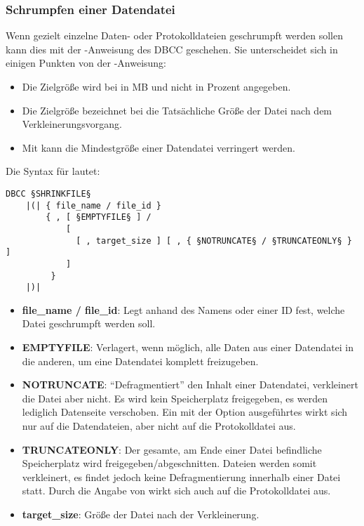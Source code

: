         \subsubsection{Schrumpfen einer Datendatei}
          Wenn gezielt einzelne Daten- oder Protokolldateien geschrumpft werden
          sollen kann dies mit der -Anweisung des DBCC
          geschehen. Sie unterscheidet sich in einigen Punkten von der
          -Anweisung:
          \begin{itemize}
              \item Die Zielgröße wird bei  in MB und
              nicht in Prozent angegeben.
              \item Die Zielgröße bezeichnet bei  die
              Tatsächliche Größe der Datei nach dem Verkleinerungsvorgang.
              \item Mit  kann die Mindestgröße einer
              Datendatei verringert werden.
          \end{itemize}
          Die Syntax für  lautet:
          \begin{lstlisting}[language=ebnf, caption={Die Syntax zu
          SHRINKFILE}, label=admin03_34]
DBCC §SHRINKFILE§
    |(| { file_name / file_id }
        { , [ §EMPTYFILE§ ] / 
            [ 
              [ , target_size ] [ , { §NOTRUNCATE§ / §TRUNCATEONLY§ } ]
            ]
         }
    |)|
          \end{lstlisting}
          \begin{itemize}
            \item \textbf{file\_name / file\_id}: Legt anhand des
            Namens oder einer ID fest, welche Datei geschrumpft werden soll.
            \item \textbf{EMPTYFILE}: Verlagert, wenn möglich, alle Daten aus
            einer Datendatei in die anderen, um eine Datendatei komplett
            freizugeben.
            \item \textbf{NOTRUNCATE}: \enquote{Defragmentiert} den
            Inhalt einer Datendatei, verkleinert die Datei aber nicht. Es wird
            kein Speicherplatz freigegeben, es werden lediglich Datenseite
            verschoben. Ein mit der Option 
            ausgeführtes  wirkt sich nur
            auf die Datendateien, aber nicht auf die Protokolldatei aus.
            \item \textbf{TRUNCATEONLY}: Der gesamte, am Ende einer
            Datei befindliche Speicherplatz wird freigegeben/abgeschnitten.
            Dateien werden somit verkleinert, es findet jedoch keine
            Defragmentierung innerhalb einer Datei statt. Durch die Angabe von
             wirkt sich  auch auf die Protokolldatei aus.
            \item \textbf{target\_size}: Größe der Datei nach der
            Verkleinerung.
          \end{itemize}
